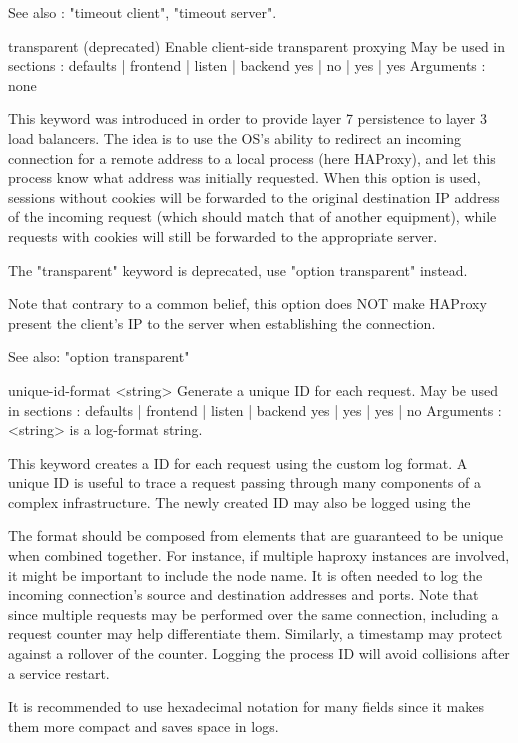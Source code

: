   See also : "timeout client", "timeout server".


transparent (deprecated)
  Enable client-side transparent proxying
  May be used in sections :   defaults | frontend | listen | backend
                                 yes   |    no    |   yes  |   yes
  Arguments : none

  This keyword was introduced in order to provide layer 7 persistence to layer
  3 load balancers. The idea is to use the OS's ability to redirect an incoming
  connection for a remote address to a local process (here HAProxy), and let
  this process know what address was initially requested. When this option is
  used, sessions without cookies will be forwarded to the original destination
  IP address of the incoming request (which should match that of another
  equipment), while requests with cookies will still be forwarded to the
  appropriate server.

  The "transparent" keyword is deprecated, use "option transparent" instead.

  Note that contrary to a common belief, this option does NOT make HAProxy
  present the client's IP to the server when establishing the connection.

  See also: "option transparent"

unique-id-format <string>
  Generate a unique ID for each request.
  May be used in sections :   defaults | frontend | listen | backend
                                  yes  |    yes   |   yes  |   no
  Arguments :
    <string>   is a log-format string.

  This keyword creates a ID for each request using the custom log format. A
  unique ID is useful to trace a request passing through many components of
  a complex infrastructure. The newly created ID may also be logged using the

  The format should be composed from elements that are guaranteed to be
  unique when combined together. For instance, if multiple haproxy instances
  are involved, it might be important to include the node name. It is often
  needed to log the incoming connection's source and destination addresses
  and ports. Note that since multiple requests may be performed over the same
  connection, including a request counter may help differentiate them.
  Similarly, a timestamp may protect against a rollover of the counter.
  Logging the process ID will avoid collisions after a service restart.

  It is recommended to use hexadecimal notation for many fields since it
  makes them more compact and saves space in logs.

